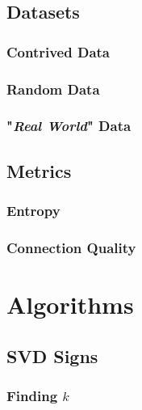 \documentclass{book}[12pt]
\numberwithin{equation}{section}
\begin{document}
\chapter{Datasets}


\section{Contrived Data}


\section{Random Data}


\section{"\emph{Real World}" Data}




\chapter{Metrics}


\section{Entropy}


\section{Connection Quality}






\part{Algorithms}

\chapter{SVD Signs}


\section{Finding $k$}

\end{document}

